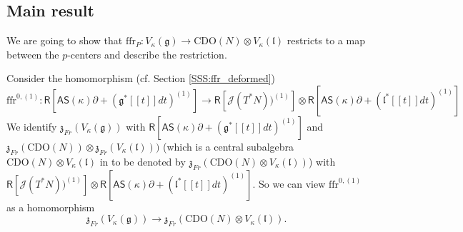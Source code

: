 \documentclass{amsart}
\newtheorem{Lem}[Thm]{Lemma}
\theoremstyle{definition}
\newcommand{\Ring}{\mathsf{R}}
\newcommand{\g}{\mathfrak{g}}
\newcommand{\ffr}{\mathrm{ffr}}
\newcommand{\lf}{\mathfrak{l}}
\newcommand{\Jet}{\mathscr{J}}
\newcommand{\ff}{\mathfrak{f}}
\newcommand{\AS}{\mathsf{AS}}
\newcommand{\CDO}{\mathrm{CDO}}
\newcommand{\frz}{\mathfrak{z}}
\numberwithin{equation}{section}
\begin{document}

\subsection{Main result}
We are going to show that $\ffr_P: V_{\kappa}(\g)\rightarrow \CDO(N)\otimes V_\kappa(\lf)$ restricts to a map between the $p$-centers and describe the restriction. 

Consider the homomorphism (cf. Section \ref{SSS:ffr_deformed})
\begin{equation}\label{eq:ffr_p_center}
\ffr^{0,(1)}:\Ring\left[\AS(\kappa)\partial+ (\g^*[[t]]dt)^{(1)}\right]\rightarrow 
\Ring[\Jet (T^*N))^{(1)}]\otimes\Ring\left[\AS(\kappa)\partial+ (\lf^*[[t]]dt)^{(1)}\right]
\end{equation}
We identify $\frz_{Fr}(V_{\kappa}(\g))$ with $\Ring\left[\AS(\kappa)\partial+ (\g^*[[t]]dt)^{(1)}\right]$ and 
$\mathfrak{z}_{Fr}(\CDO(N))\otimes \mathfrak{z}_{Fr}(V_\kappa(\lf)))$ (which is a central subalgebra $\CDO(N)\otimes V_\kappa(\lf)$ in to be denoted by $\mathfrak{z}_{Fr}(\CDO(N)\otimes V_\kappa(\lf))$) with $\Ring[\Jet (T^*N))^{(1)}]\otimes\Ring\left[\AS(\kappa)\partial+ (\lf^*[[t]]dt)^{(1)}\right]$. So we can view 
$\ffr^{0,(1)}$ as a homomorphism 
$$\mathfrak{z}_{Fr}(V_\kappa(\g))\rightarrow 
\mathfrak{z}_{Fr}(\CDO(N)\otimes V_\kappa(\lf)).$$

\end{document}
